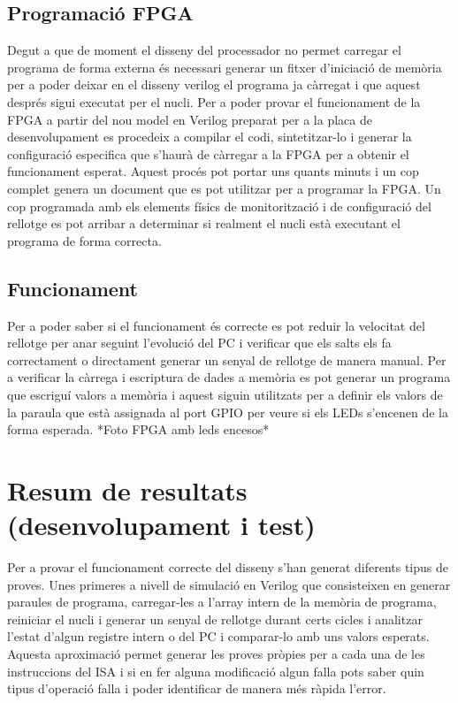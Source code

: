 \documentclass[10pt,a4paper,twocolumn,twoside]{article}
\begin{document}
    \subsection{Programació FPGA}
    Degut a que de moment el disseny del processador no permet carregar el programa de forma externa és necessari generar un fitxer d'iniciació de memòria per a poder deixar en el disseny verilog el programa ja càrregat i que aquest després sigui executat per el nucli. 
    Per a poder provar el funcionament de la FPGA a partir del nou model en Verilog preparat per a la placa de desenvolupament es procedeix a compilar el codi, sintetitzar-lo i generar la configuració especifica que s'haurà de càrregar a la FPGA per a obtenir el funcionament esperat. Aquest procés pot portar uns quants minuts i un cop complet genera un document que es pot utilitzar per a programar la FPGA. Un cop programada amb els elements físics de monitorització i de configuració del rellotge es pot arribar a determinar si realment el nucli està executant el programa de forma correcta.
    \subsection{Funcionament}
    
    Per a poder saber si el funcionament és correcte es pot reduir la velocitat del rellotge per anar seguint l'evolució del PC i verificar que els salts els fa correctament o directament generar un senyal de rellotge de manera manual.
    Per a verificar la càrrega i escriptura de dades a memòria es pot generar un programa que escriguí valors a memòria i aquest siguin utilitzats per a definir els valors de la paraula que està assignada al port GPIO per veure si els LEDs s'encenen de la forma esperada.
    *Foto FPGA amb leds encesos*

\section{Resum de resultats (desenvolupament i test)}

Per a provar el funcionament correcte del disseny s'han generat diferents tipus de proves.
Unes primeres a nivell de simulació en Verilog que consisteixen en generar paraules de programa, carregar-les a l'array intern de la memòria de programa, reiniciar el nucli i generar un senyal de rellotge durant certs cicles i analitzar l'estat d'algun registre intern o del PC i comparar-lo amb uns valors esperats. Aquesta aproximació permet generar les proves pròpies per a cada una de les instruccions del ISA i si en fer alguna modificació algun falla pots saber quin tipus d'operació falla i poder identificar de manera més ràpida l'error.
\end{document}
